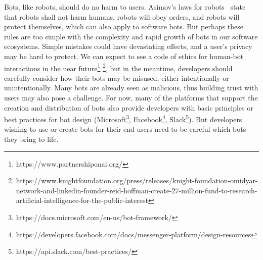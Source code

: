 \documentclass{sig-alternate}
\begin{document}
	Bots, like robots, should do no harm to users.  
	Asimov's laws for robots~\cite{asimov1950evitable} state that 
	robots shall not harm humans, robots will obey orders, and robots will protect themselves, which can also apply to software bots.
	But perhaps these rules are too simple with the complexity and rapid growth of bots in our software ecosystems.  Simple mistakes could have devastating effects, and a user's privacy may be hard to protect.  
	We can expect to see a code of ethics for human-bot interactions in the near future\footnote{https://www.partnershiponai.org/} \footnote{https://www.knightfoundation.org/press/releases/knight-foundation-omidyar-network-and-linkedin-founder-reid-hoffman-create-27-million-fund-to-research-artificial-intelligence-for-the-public-interest}, but in the meantime, developers should carefully consider how their bots may be misused, either intentionally or unintentionally. Many bots are already seen as malicious, thus building trust with users may also pose a challenge. 
	For now, many of the platforms that support the creation and distribution of bots also provide developers with basic principles or best practices for bot design (Microsoft\footnote{https://docs.microsoft.com/en-us/bot-framework/}, Facebook\footnote{https://developers.facebook.com/docs/messenger-platform/design-resources}, Slack\footnote{https://api.slack.com/best-practices/}).
	But developers wishing to use or create bots for their end users need to be careful which bots they bring to life.
	
\end{document}

